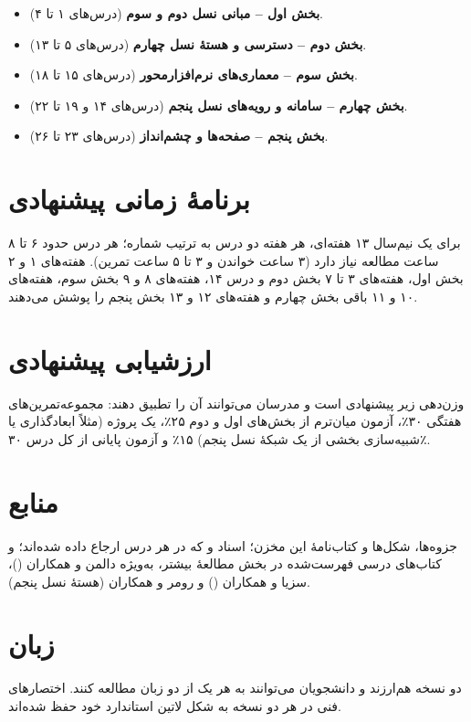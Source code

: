 \documentclass[11pt,a4paper]{article}
\begin{document}
\begin{itemize}
  \item \textbf{بخش اول -- مبانی نسل دوم و سوم} (درس‌های ۱ تا ۴).
  \item \textbf{بخش دوم -- دسترسی و هستهٔ نسل چهارم} (درس‌های ۵ تا ۱۳).
  \item \textbf{بخش سوم -- معماری‌های نرم‌افزارمحور} (درس‌های ۱۵ تا ۱۸).
  \item \textbf{بخش چهارم -- سامانه و رویه‌های نسل پنجم} (درس‌های ۱۴ و ۱۹ تا ۲۲).
  \item \textbf{بخش پنجم -- صفحه‌ها و چشم‌انداز} (درس‌های ۲۳ تا ۲۶).
\end{itemize}

\section{برنامهٔ زمانی پیشنهادی}
برای یک نیم‌سال ۱۳ هفته‌ای، هر هفته دو درس به ترتیب شماره؛ هر درس حدود ۶ تا ۸ ساعت مطالعه نیاز دارد (۳ ساعت خواندن و ۳ تا ۵ ساعت تمرین). هفته‌های ۱ و ۲
بخش اول، هفته‌های ۳ تا ۷ بخش دوم و درس ۱۴، هفته‌های ۸ و ۹ بخش سوم، هفته‌های ۱۰ و ۱۱ باقی بخش چهارم و هفته‌های ۱۲ و ۱۳ بخش پنجم را پوشش می‌دهند.

\section{ارزشیابی پیشنهادی}
وزن‌دهی زیر پیشنهادی است و مدرسان می‌توانند آن را تطبیق دهند: مجموعه‌تمرین‌های هفتگی ۳۰٪، آزمون میان‌ترم از بخش‌های اول و دوم ۲۵٪، یک پروژه (مثلاً
ابعادگذاری یا شبیه‌سازی بخشی از یک شبکهٔ نسل پنجم) ۱۵٪ و آزمون پایانی از کل درس ۳۰٪.

\section{منابع}
جزوه‌ها، شکل‌ها و کتاب‌نامهٔ این مخزن؛ اسناد  و  که در هر درس ارجاع داده شده‌اند؛ و کتاب‌های درسی فهرست‌شده در بخش مطالعهٔ بیشتر،
به‌ویژه دالمن و همکاران ()، سزیا و همکاران () و رومر و همکاران (هستهٔ نسل پنجم).

\section{زبان}
دو نسخه هم‌ارزند و دانشجویان می‌توانند به هر یک از دو زبان مطالعه کنند. اختصارهای فنی در هر دو نسخه به شکل لاتین استاندارد خود حفظ شده‌اند.
\end{document}
